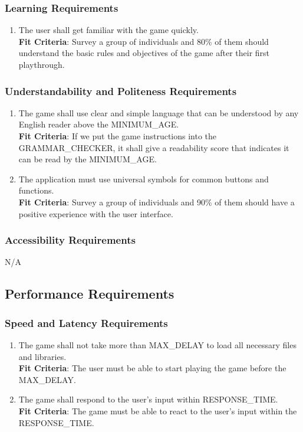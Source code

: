 \documentclass[12pt, titlepage]{article}
\begin{document}
\subsubsection{Learning Requirements}
\begin{enumerate}[leftmargin=1.45cm, label={UH \arabic*}]
    \item The user shall get familiar with the game quickly.\\
    \textbf{Fit Criteria}: Survey a group of individuals and 80\% of them should understand the basic rules and objectives of the game after their first playthrough.
\end{enumerate}

\subsubsection{Understandability and Politeness Requirements}
\begin{enumerate}[leftmargin=1.45cm, label={UH \arabic*}]
    \item The game shall use clear and simple language that can be understood by any English reader above the MINIMUM\_AGE.\\
    \textbf{Fit Criteria}: If we put the game instructions into the GRAMMAR\_CHECKER, it shall give a readability score that indicates it can be read by the MINIMUM\_AGE.
    
    \item The application must use universal symbols for common buttons and functions.\\
    \textbf{Fit Criteria}: Survey a group of individuals and 90\% of them should have a positive experience with the user interface.
\end{enumerate}

\subsubsection{Accessibility Requirements}
N/A

\subsection{Performance Requirements}
\subsubsection{Speed and Latency Requirements}
\begin{enumerate}[leftmargin=1.45cm, label={PR \arabic*}]
    \item The game shall not take more than MAX\_DELAY to load all necessary files and libraries.\\
    \textbf{Fit Criteria}: The user must be able to start playing the game before the MAX\_DELAY.
    \item The game shall respond to the user's input within RESPONSE\_TIME. \\
    \textbf{Fit Criteria}: The game must be able to react to the user's input within the RESPONSE\_TIME.
\end{enumerate}
\end{document}
